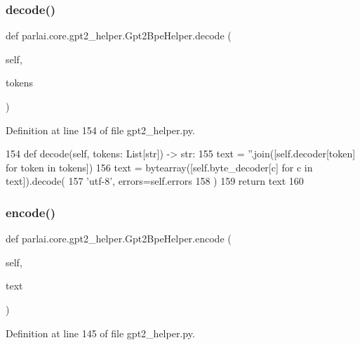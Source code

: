 \subsubsection{\texorpdfstring{decode()}{decode()}}
{\footnotesize\ttfamily def parlai.\+core.\+gpt2\+\_\+helper.\+Gpt2\+Bpe\+Helper.\+decode (\begin{DoxyParamCaption}\item[{}]{self,  }\item[{}]{tokens }\end{DoxyParamCaption})}



Definition at line 154 of file gpt2\+\_\+helper.\+py.


\begin{DoxyCode}
154     \textcolor{keyword}{def }decode(self, tokens: List[str]) -> str:
155         text = \textcolor{stringliteral}{''}.join([self.decoder[token] \textcolor{keywordflow}{for} token \textcolor{keywordflow}{in} tokens])
156         text = bytearray([self.byte\_decoder[c] \textcolor{keywordflow}{for} c \textcolor{keywordflow}{in} text]).decode(
157             \textcolor{stringliteral}{'utf-8'}, errors=self.errors
158         )
159         \textcolor{keywordflow}{return} text
160 
\end{DoxyCode}
\mbox{\label{classparlai_1_1core_1_1gpt2__helper_1_1Gpt2BpeHelper_a1957224e1cefc6c5a0ec1c4e992ffe37}} 
\subsubsection{\texorpdfstring{encode()}{encode()}}
{\footnotesize\ttfamily def parlai.\+core.\+gpt2\+\_\+helper.\+Gpt2\+Bpe\+Helper.\+encode (\begin{DoxyParamCaption}\item[{}]{self,  }\item[{}]{text }\end{DoxyParamCaption})}



Definition at line 145 of file gpt2\+\_\+helper.\+py.


